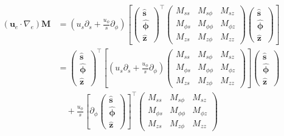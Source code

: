 \[\begin{aligned}
    (\mathbf{u}_e\cdot \nabla_e) \mathbf{M} &= \left(u_s \partial_s + \frac{u_\phi}{s}\partial_\phi\right)
    \left[
        \begin{pmatrix}\hat{\mathbf{s}} \\ \hat{\bm{\phi}} \\ \hat{\mathbf{z}}\end{pmatrix}^\top 
        \begin{pmatrix}
            M_{ss} & M_{s\phi} & M_{sz} \\ 
            M_{\phi s} & M_{\phi\phi} & M_{\phi z} \\ 
            M_{zs} & M_{z\phi} & M_{zz}
        \end{pmatrix}
        \begin{pmatrix}\hat{\mathbf{s}} \\ \hat{\bm{\phi}} \\ \hat{\mathbf{z}}\end{pmatrix}
    \right] \\
    &= \begin{pmatrix}\hat{\mathbf{s}} \\ \hat{\bm{\phi}} \\ \hat{\mathbf{z}}\end{pmatrix}^\top 
    \left[\left(u_s \partial_s + \frac{u_\phi}{s}\partial_\phi\right) \begin{pmatrix}
        M_{ss} & M_{s\phi} & M_{sz} \\ 
        M_{\phi s} & M_{\phi\phi} & M_{\phi z} \\ 
        M_{zs} & M_{z\phi} & M_{zz}
    \end{pmatrix}\right]
    \begin{pmatrix}\hat{\mathbf{s}} \\ \hat{\bm{\phi}} \\ \hat{\mathbf{z}}\end{pmatrix} \\ 
    &\quad + \frac{u_\phi}{s} \left[\partial_\phi\begin{pmatrix}\hat{\mathbf{s}} \\ \hat{\bm{\phi}} \\ \hat{\mathbf{z}}\end{pmatrix}\right]^\top \begin{pmatrix}
        M_{ss} & M_{s\phi} & M_{sz} \\ 
        M_{\phi s} & M_{\phi\phi} & M_{\phi z} \\ 
        M_{zs} & M_{z\phi} & M_{zz}

\end{pmatrix}
\end{aligned}\]
